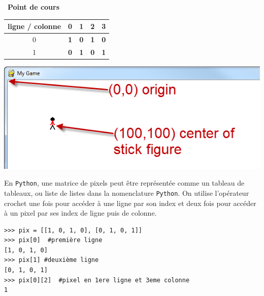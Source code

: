 \documentclass[a4paper, french, 12pt]{article}
\newcounter{cours}
\newenvironment{cours}[1]
{\par \medskip   \addtocounter{cours}{1} \noindent  
\begin{bclogo}[arrondi =0.1,  ombre = true, barre=none, logo=\bcbook, marge=4]{~\textbf{Point de cours} \textbf{\thecours} {\itshape #1} }  \par}
{
\end{bclogo}
 \par \bigskip }
\begin{document}
\begin{cours}{}
\begin{minipage}{0.4\linewidth}
\begin{center}
\begin{tabular}{|c|c|c|c|c|}
\hline 
ligne / colonne & 0 & 1 & 2 & 3 \\ 
\hline 
0 & \textbf{1} & \textbf{0} & \textbf{1} & \textbf{0} \\ 
\hline 
1 & \textbf{0} &\textbf{1} & \textbf{0} & \textbf{1} \\ 
\hline 
\end{tabular} 
\end{center}
\end{minipage}
\hfill
\begin{minipage}{0.4\linewidth}
\begin{center}
\includegraphics[scale=0.5]{images/positionnement.png}
\end{center}
\end{minipage}

En \texttt{Python}, une matrice de pixels peut être représentée comme un tableau de tableaux, ou liste de listes dans la nomenclature \texttt{Python}. On utilise l'opérateur crochet une fois pour accéder à une ligne par son index et deux fois pour accéder à un pixel par ses index de ligne puis de colonne.


\begin{lstlisting}[style=rond]
>>> pix = [[1, 0, 1, 0], [0, 1, 0, 1]]
>>> pix[0]  #première ligne 
[1, 0, 1, 0]
>>> pix[1] #deuxième ligne
[0, 1, 0, 1]
>>> pix[0][2]  #pixel en 1ere ligne et 3eme colonne
1
\end{lstlisting}



\end{cours}
\end{document}
